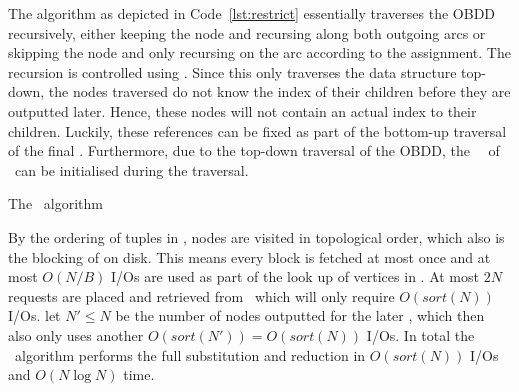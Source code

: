 The algorithm as depicted in Code~\ref{lst:restrict} essentially traverses the
OBDD recursively, either keeping the node and recursing along both outgoing arcs
or skipping the node and only recursing on the arc according to the assignment.
The recursion is controlled using \RestrictQrec. Since this only traverses the
data structure top-down, the nodes traversed do not know the index of their
children before they are outputted later. Hence, these nodes will not contain an
actual index to their children. Luckily, these references can be fixed as part
of the bottom-up traversal of the final \Reduce. Furthermore, due to the
top-down traversal of the OBDD, the \ReduceLwork\, \ReduceLdep\ of \Reduce\ can
be initialised during the traversal.

\begin{lstfloat}
  \centering

  

  \caption{The \Restrict\ algorithm}
  \label{lst:restrict}
\end{lstfloat}

By the ordering of tuples in \RestrictQrec, nodes are visited in topological
order, which also is the blocking of \GV on disk. This means every block is
fetched at most once and at most $O(N/B)$ I/Os are used as part of the look up
of vertices in \GV. At most $2N$ requests are placed and retrieved from \Q\
which will only require $O(sort(N))$ I/Os. let $N' \leq N$ be the number of
nodes outputted for the later \Reduce, which then also only uses another
$O(sort(N')) = O(sort(N))$ I/Os. In total the \Restrict\ algorithm performs
the full substitution and reduction in $O(sort(N))$ I/Os and $O(N \log N)$ time.

\clearpage
